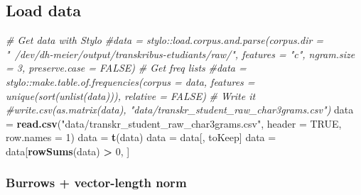 \documentclass[]{article}
\newenvironment{Shaded}{\begin{snugshade}}{\end{snugshade}}
\newcommand{\CommentTok}[1]{\textcolor[rgb]{0.56,0.35,0.01}{\textit{#1}}}
\newcommand{\DataTypeTok}[1]{\textcolor[rgb]{0.13,0.29,0.53}{#1}}
\newcommand{\DecValTok}[1]{\textcolor[rgb]{0.00,0.00,0.81}{#1}}
\newcommand{\KeywordTok}[1]{\textcolor[rgb]{0.13,0.29,0.53}{\textbf{#1}}}
\newcommand{\NormalTok}[1]{#1}
\newcommand{\OperatorTok}[1]{\textcolor[rgb]{0.81,0.36,0.00}{\textbf{#1}}}
\newcommand{\OtherTok}[1]{\textcolor[rgb]{0.56,0.35,0.01}{#1}}
\newcommand{\StringTok}[1]{\textcolor[rgb]{0.31,0.60,0.02}{#1}}
\begin{document}
\hypertarget{load-data-1}{%
\subsection{Load data}\label{load-data-1}}

\begin{Shaded}
\begin{Highlighting}[]
\CommentTok{# Get data with Stylo}
\CommentTok{#data = stylo::load.corpus.and.parse(corpus.dir = "~/dev/dh-meier/output/transkribus-etudiants/raw/", features = "c", ngram.size = 3, preserve.case = FALSE)}
\CommentTok{# Get freq lists}
\CommentTok{#data = stylo::make.table.of.frequencies(corpus = data, features = unique(sort(unlist(data))), relative = FALSE)}
\CommentTok{# Write it}
\CommentTok{#write.csv(as.matrix(data), "data/transkr_student_raw_char3grams.csv")}
\NormalTok{data =}\StringTok{ }\KeywordTok{read.csv}\NormalTok{(}\StringTok{"data/transkr_student_raw_char3grams.csv"}\NormalTok{, }\DataTypeTok{header =} \OtherTok{TRUE}\NormalTok{, }\DataTypeTok{row.names =} \DecValTok{1}\NormalTok{)}
\NormalTok{data =}\StringTok{ }\KeywordTok{t}\NormalTok{(data)}
\NormalTok{data =}\StringTok{ }\NormalTok{data[, toKeep]}
\NormalTok{data =}\StringTok{ }\NormalTok{data[}\KeywordTok{rowSums}\NormalTok{(data) }\OperatorTok{>}\StringTok{ }\DecValTok{0}\NormalTok{, ]}
\end{Highlighting}
\end{Shaded}

\hypertarget{burrows-vector-length-norm}{%
\subsubsection{Burrows + vector-length
norm}\label{burrows-vector-length-norm}}
\end{document}
